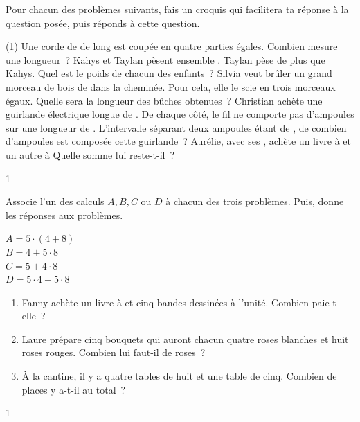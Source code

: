 \documentclass[a4paper,11pt]{report}
\begin{document}
\begin{exo}{
    Pour chacun des problèmes suivants, fais un croquis qui facilitera ta réponse à la question posée, puis réponds à cette question.
    
    \begin{tasks}(1)
	    \task Une corde de  de long est coupée en quatre parties égales. Combien mesure une longueur~?
	    \task Kahys et Taylan pèsent ensemble . Taylan pèse  de plus que Kahys. Quel est le poids de chacun des enfants~?
	    \task Silvia veut brûler un grand morceau de bois de  dans la cheminée. Pour cela, elle le scie en trois morceaux égaux. Quelle sera la longueur des bûches obtenues~?
	    \task Christian achète une guirlande électrique longue de . De chaque côté, le fil ne comporte pas d'ampoules sur une longueur de . L'intervalle séparant deux ampoules étant de , de combien d'ampoules est composée cette guirlande~?
	    \task Aurélie, avec ses , achète un livre à  et un autre à  Quelle somme lui reste-t-il~?
    \end{tasks}
}{1}\end{exo}


\vfill

\newpage

\begin{exo}{
    Associe l'un des calculs $A, B, C$ ou $D$ à chacun des trois problèmes. Puis, donne les réponses aux problèmes. 
    \vspace{-0.5cm}
    \begin{center}
    \begin{multicols}{2}
    $A=5\cdot(4+8)$ \\
    $B=4+5\cdot8$\quad~ \\
    $C=5+4\cdot8$\quad~ \\
    $D=5\cdot4+5\cdot8$
    \end{multicols}
    \end{center}
    
    \begin{enumerate}
	    \item[\ligne{2}] Fanny achète un livre à  et cinq bandes dessinées à  l'unité. Combien paie-t-elle~?
	    \item[\ligne{2}] Laure prépare cinq bouquets qui auront chacun quatre roses blanches et huit roses rouges. Combien lui faut-il de roses~?
	    \item[\ligne{2}]  À la cantine, il y a quatre tables de huit et une table de cinq. Combien de places y a-t-il au total~?
    \end{enumerate}
    
}{1}\end{exo}
\end{document}
